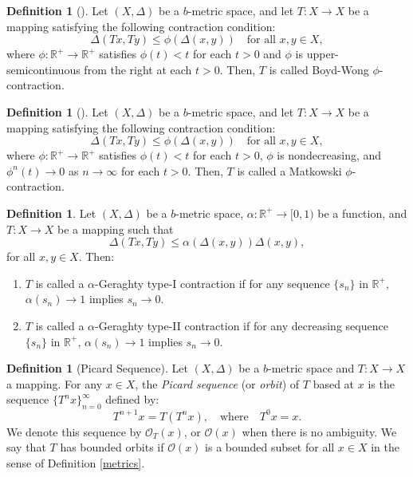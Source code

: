 \documentclass{birkjour}
\theoremstyle{definition}
\newtheorem{defn}[thm]{Definition}
\theoremstyle{remark}
\numberwithin{equation}{section}
\begin{document}
\begin{defn}[\cite{boyd1969nonlinear}]\label{thm:boyd-wong}
Let \((X, \Delta)\) be a $b$-metric space, and let \(T: X \to X\) be a mapping satisfying the following contraction condition:
\[
\Delta(Tx, Ty) \le \phi(\Delta(x, y)) \quad \text{for all } x, y \in X,
\]
where \(\phi: \mathbb{R}^{+} \to \mathbb{R}^{+}\) satisfies \(\phi(t) < t\) for each \(t > 0\) and \(\phi\) is upper-semicontinuous from the right at each \(t > 0\). 
Then, \(T\) is called Boyd-Wong  $\phi$-contraction.
\end{defn}
\begin{defn}[\cite{matkowski1975integrable}]\label{thm:matkowski}
Let \((X, \Delta)\) be a $b$-metric space, and let \(T: X \to X\) be a mapping satisfying the following contraction condition:
\[
\Delta(Tx, Ty) \le \phi(\Delta(x, y)) \quad \text{for all } x, y \in X,
\]
where \(\phi: \mathbb{R}^{+} \to \mathbb{R}^{+}\) satisfies \(\phi(t) < t\) for each \(t > 0\), \(\phi\) is nondecreasing, and \(\phi^{n}(t) \to 0\) as \(n \to \infty\) for each \(t > 0\). 
Then, \(T\) is called a Matkowski  $\phi$-contraction.
\end{defn}
\begin{defn}\label{geragh_defn}
Let \((X,\Delta)\) be a $b$-metric space, \(\alpha: \mathbb{R}^{+} \to [0,1)\) be a function, and \(T:X\to X\) be a mapping such that
\[
\Delta(Tx,Ty)\le \alpha(\Delta(x,y))\Delta(x,y),
\]
for all $x,y\in X$. Then:
\begin{enumerate}
    \item \(T\) is called a $\alpha$-Geraghty type-I contraction if for any sequence \(\{s_n\}\) in \(\mathbb{R}^{+}\), \(\alpha(s_n)\to 1\) implies \(s_n\to 0\).
    \item \(T\) is called a $\alpha$-Geraghty type-II contraction if for any decreasing sequence \(\{s_n\}\) in \(\mathbb{R}^{+}\), \(\alpha(s_n)\to 1\) implies \(s_n\to 0\).
\end{enumerate}
\end{defn}
\begin{defn}[Picard Sequence]
Let $(X,\Delta)$ be a $b$-metric space and $T: X\to X$ a mapping. For any $x \in X$, the \emph{Picard sequence} (or \emph{orbit}) of $T$ based at $x$ is the sequence $\{T^n x\}_{n=0}^\infty$ defined by:
\[
T^{n+1}x = T(T^n x), \quad \text{where} \quad T^0 x = x.
\]
We denote this sequence by $\mathcal{O}_{T}(x)$, or $\mathcal{O}(x)$ when there is no ambiguity. We say that $T$ has bounded orbits if  $\mathcal{O}(x)$ is a bounded subset for all $x\in X$ in the sense of Definition \ref{metrics}. 
\end{defn}
\end{document}
